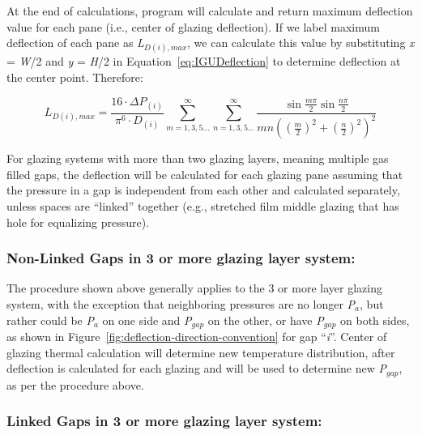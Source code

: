 At the end of calculations, program will calculate and return maximum deflection value for each pane (i.e., center of glazing deflection). If we label maximum deflection of each pane as \emph{L\(_{D(i),max}\)}, we can calculate this value by substituting \emph{x} = \emph{W}/2 and \emph{y} = \emph{H}/2 in Equation~\ref{eq:IGUDeflection} to determine deflection at the center point. Therefore:

\begin{equation}
{L_{D\left( i \right),max}} = \frac{{16\cdot \Delta {P_{\left( i \right)}}}}{{{\pi ^6}\cdot {D_{\left( i \right)}}}}\mathop \sum \limits_{m = 1,3,5 \ldots }^\infty  \mathop \sum \limits_{n = 1,3,5 \ldots }^\infty  \frac{{\sin \frac{{m\pi }}{2}\sin \frac{{n\pi }}{2}}}{{mn{{\left( {{{\left( {\frac{m}{2}} \right)}^2} + {{\left( {\frac{n}{2}} \right)}^2}} \right)}^2}}}
\label{eq:IGULDimaxDeflection}
\end{equation}

For glazing systems with more than two glazing layers, meaning multiple gas filled gaps, the deflection will be calculated for each glazing pane assuming that the pressure in a gap is independent from each other and calculated separately, unless spaces are ``linked'' together (e.g., stretched film middle glazing that has hole for equalizing pressure).

\subsubsection{Non-Linked Gaps in 3 or more glazing layer system:}\label{non-linked-gaps-in-3-or-more-glazing-layer-system}

The procedure shown above generally applies to the 3 or more layer glazing system, with the exception that neighboring pressures are no longer \emph{P\(_{a}\)}, but rather could be \emph{P\(_{a}\)} on one side and \emph{P\(_{gap}\)} on the other, or have \emph{P\(_{gap}\)} on both sides, as shown in Figure~\ref{fig:deflection-direction-convention} for gap ``\emph{i}''. Center of glazing thermal calculation will determine new temperature distribution, after deflection is calculated for each glazing and will be used to determine new \emph{P\(_{gap}\)}, as per the procedure above.

\subsubsection{Linked Gaps in 3 or more glazing layer system:}\label{linked-gaps-in-3-or-more-glazing-layer-system}

